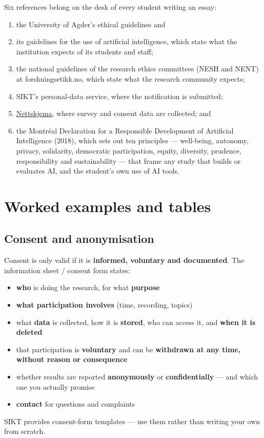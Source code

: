 \documentclass[11pt,a4paper,british,twoside=false,headings=small,chapterprefix=false,numbers=noenddot]{scrbook}
\begin{document}
Six references belong on the desk of every student writing an essay:
\begin{enumerate}
  \item the University of Agder's ethical guidelines and
  \item its guidelines for the use of artificial intelligence, which state what the institution expects of its students and staff;
  \item the national guidelines of the research ethics committees (NESH and NENT) at forskningsetikk.no, which state what the research community expects;
  \item SIKT's personal-data service, where the notification is submitted;
  \item \href{https://nettskjema.no}{Nettskjema}, where survey and consent data are collected; and
  \item the Montréal Declaration for a Responsible Development of Artificial Intelligence (2018), which sets out ten principles --- well-being, autonomy, privacy, solidarity, democratic participation, equity, diversity, prudence, responsibility and sustainability --- that frame any study that builds or evaluates AI, and the student's own use of AI tools.
\end{enumerate}


\section{Worked examples and tables}

\subsection{Consent and anonymisation}
\begin{center}\small
\footnotesize Consent is only valid if it is \textbf{informed, voluntary
  and documented}. The information sheet / consent form states:
  \begin{itemize}\setlength{\itemsep}{0.2em}
    \item \textbf{who} is doing the research, for what \textbf{purpose}
    \item \textbf{what participation involves} (time, recording, topics)
    \item what \textbf{data} is collected, how it is \textbf{stored},
          who can access it, and \textbf{when it is deleted}
    \item that participation is \textbf{voluntary} and can be
          \textbf{withdrawn at any time, without reason or consequence}
    \item whether results are reported \textbf{anonymously} or
          \textbf{confidentially} --- and which one you actually promise
    \item \textbf{contact} for questions and complaints
  \end{itemize}
  {\color{kgrey}\footnotesize SIKT provides consent-form templates --- use
  them rather than writing your own from scratch.}
\end{center}
\end{document}
